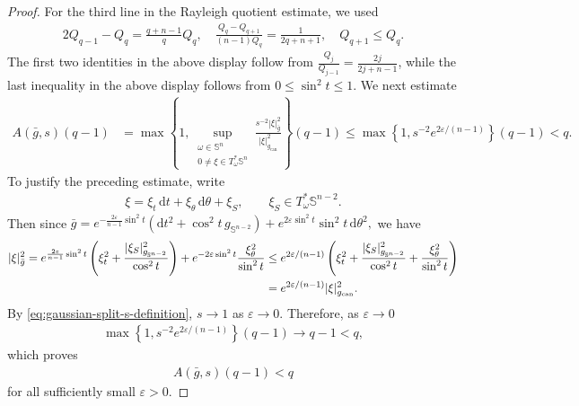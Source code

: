 \documentclass[11pt,reqno]{amsart}
\numberwithin{equation}{section}
\theoremstyle{definition}
\theoremstyle{remark}
\def\bS {\mathbb{S}}
\newcommand{\ud}{\mathrm{d}}
\newcommand{\0}{\emptyset}
\newcommand{\veps}{\varepsilon}
\newcommand{\bbS}{\mathbb S}
\newcommand{\can}{\mathrm{can}}
\begin{document}
\begin{proof}
For the third line in the Rayleigh quotient estimate, we used
\begin{align}
        2Q_{q-1}-Q_q
        =
        \frac{q+n-1}{q}Q_q, \quad 
        \frac{Q_q-Q_{q+1}}{(n-1)Q_q}
        =
        \frac1{2q+n+1},\quad 
        Q_{q+1}
        \leq
        Q_q.
\end{align}
The first two identities in the above display follow from
$\frac{Q_j}{Q_{j-1}}=\frac{2j}{2j+n-1}$, while the last inequality in the above display follows
from $0\leq\sin^2t\leq1$. We next estimate
\begin{align}
        A(\bar g,s)(q-1)
        &=
        \max\left\{
        1,
        \sup_{\substack{\omega\in\bbS^n\\
        0\neq\xi\in T_\omega^*\bbS^n}}
        \frac{s^{-2}|\xi|_{\bar g}^2}
        {|\xi|_{g_\can}^2}
        \right\}
        (q-1)
        \leq
        \max\left\{
        1,
        s^{-2}e^{2\veps/(n-1)}
        \right\}
        (q-1)
        <
        q.
\end{align}
To justify the preceding estimate, write
\begin{align}
        \xi
        =
        \xi_t\,\ud t+\xi_\theta\,\ud\theta+\xi_S,
        \qquad
        \xi_S\in T_\omega^*\bS^{n-2}.
\end{align}
Then since  $\bar g
        =
        e^{-\frac{2\veps}{n-1}\sin^2t}
        \left(
        \ud t^2+\cos^2t\,g_{\bbS^{n-2}}
        \right)
        +
        e^{2\veps\sin^2t}
        \sin^2t\,\ud\theta^2,$
we have
\begin{align}
        |\xi|_{\bar g}^2
        =
        e^{\frac{2\veps}{n-1}\sin^2t}
        \left(
        \xi_t^2+
        \frac{|\xi_S|_{g_{\bbS^{n-2}}}^2}{\cos^2t}
        \right)
        +
        e^{-2\veps\sin^2t}
        \frac{\xi_\theta^2}{\sin^2t}
        &\leq
        e^{2\veps/(n-1)}
        \left(
        \xi_t^2+
        \frac{|\xi_S|_{g_{\bbS^{n-2}}}^2}{\cos^2t}
        +
        \frac{\xi_\theta^2}{\sin^2t}
        \right)
        \notag\\
        &=
        e^{2\veps/(n-1)}
        |\xi|_{g_\can}^2.
\end{align}
By \eqref{eq:gaussian-split-s-definition}, $s\to1$ as
$\veps\to 0 $. Therefore, as $\veps \to 0$
\begin{align}
        \max\left\{
        1,
        s^{-2}e^{2\veps/(n-1)}
        \right\}
        (q-1)
        \rightarrow
        q-1
        <
        q,
\end{align}
which proves
\begin{align}
        A(\bar g,s)(q-1)
        <
        q
\end{align}
for all sufficiently small $\veps>0$.
\end{proof}
\end{document}
